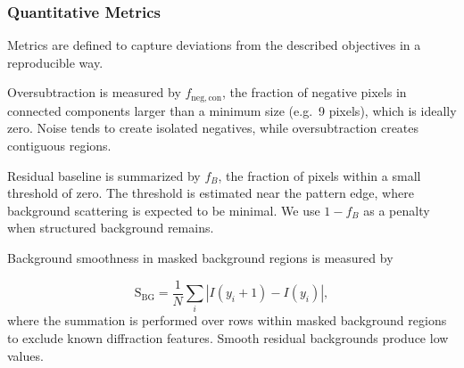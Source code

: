 \documentclass[iucr]{iucrjournals}
\begin{document}
\subsubsection{Quantitative Metrics}

Metrics are defined to capture deviations from the described objectives in a reproducible way.


Oversubtraction is measured by $f_{\mathrm{neg,con}}$, the fraction of negative pixels in connected components larger than a minimum size (e.g.\ 9 pixels), which is ideally zero. Noise tends to create isolated negatives, while oversubtraction creates contiguous regions.


Residual baseline is summarized by $f_B$, the fraction of pixels within a small threshold of zero. The threshold is estimated near the pattern edge, where background scattering is expected to be minimal. We use $1-f_B$ as a penalty when structured background remains.


Background smoothness in masked background regions is measured by

\begin{equation}
\mathrm{S}_{\mathrm{BG}} =
\frac{1}{N} \sum_i \left| I(y_i + 1) - I(y_i) \right|,
\end{equation}
where the summation is performed over rows within masked background regions to exclude known diffraction features. Smooth residual backgrounds produce low values.
\end{document}
